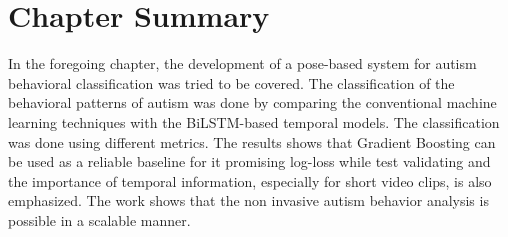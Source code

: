 \section*{Chapter Summary}

In the foregoing chapter, the development of a pose-based system for autism behavioral classification was tried to be covered. The classification of the behavioral patterns of autism was done by comparing the conventional machine learning techniques with the BiLSTM-based temporal models. The classification was done using different metrics. The results shows that Gradient Boosting can be used as a reliable baseline for it promising log-loss while test validating and the importance of temporal information, especially for short video clips, is also emphasized. The work shows that the non invasive autism behavior analysis is possible in a scalable manner.
